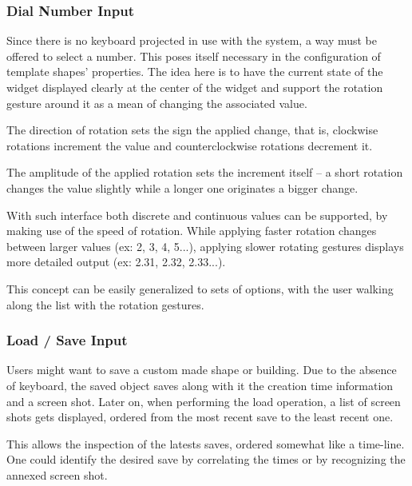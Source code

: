 \subsubsection{Dial Number Input}

Since there is no keyboard projected in use with the system, a way must be offered to select a number.
This poses itself necessary in the configuration of template shapes' properties.
The idea here is to have the current state of the widget displayed clearly at the center of the widget
and support the rotation gesture around it as a mean of changing the associated value.


The direction of rotation sets the sign the applied change, that is, clockwise rotations increment
the value and counterclockwise rotations decrement it.

The amplitude of the applied rotation sets the increment itself -- a short rotation changes the value
slightly while a longer one originates a bigger change.

With such interface both discrete and continuous values can be supported, by making use of the speed of rotation.
While applying faster rotation changes between larger values (ex: 2, 3, 4, 5...), applying slower rotating
gestures displays more detailed output (ex: 2.31, 2.32, 2.33...).

This concept can be easily generalized to sets of options, with the user walking along the list with the rotation gestures.


\subsubsection{Load / Save Input}


Users might want to save a custom made shape or building. Due to the absence of keyboard, the saved object
saves along with it the creation time information and a screen shot.
Later on, when performing the load operation, a list of screen shots gets displayed, ordered from the most
recent save to the least recent one.

This allows the inspection of the latests saves, ordered somewhat like a time-line. One could identify the
desired save by correlating the times or by recognizing the annexed screen shot.

